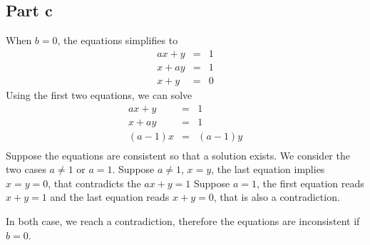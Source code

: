 \subsection*{Part c}
When $ b = 0 $, the equations simplifies to
\begin{eqnarray*}
  ax + y &=& 1 \\
   x + ay &=& 1 \\
   x + y &=& 0
\end{eqnarray*}
Using the first two equations, we can solve 
\begin{eqnarray*}
  ax + y &=& 1 \\
  x + ay &=& 1 \\
  (a - 1)x &=& (a - 1)y \\
\end{eqnarray*}
Suppose the equations are consistent so that a solution exists. We consider the two cases $ a \ne 1 $ or $ a = 1 $.
Suppose $ a \ne 1 $, $ x = y $, the last equation implies $ x = y = 0 $, that contradicts the $ ax + y = 1 $
Suppose $ a = 1 $, the first equation reads $ x + y = 1 $ and the last equation reads $ x + y = 0 $, that is also a contradiction. 

In both case, we reach a contradiction, therefore the equations are inconsistent if $ b = 0 $.